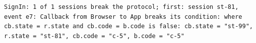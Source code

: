 \begin{lstlisting}[language={},basicstyle=\ttfamily\scriptsize,breaklines=true]
SignIn: 1 of 1 sessions break the protocol; first: session st-81, event e7: Callback from Browser to App breaks its condition: where cb.state = r.state and cb.code = b.code is false: cb.state = "st-99", r.state = "st-81", cb.code = "c-5", b.code = "c-5"
\end{lstlisting}
